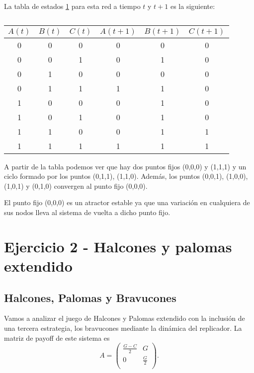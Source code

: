 \documentclass[letterpaper,12pt]{article}
\theoremstyle{plain}
\begin{document}
La tabla de estados \ref*{tab:4} para esta red a tiempo $t$ y $t+1$ es la siguiente:
\newpage
\begin{table}[h]
    \centering
    \begin{tabular}{|c|c|c|c|c|c|}
        \hline
        $A(t)$ & $B(t)$ & $C(t)$ & $A(t+1)$ & $B(t+1)$ & $C(t+1)$ \\
        \hline
        0 & 0 & 0 & 0 & 0 & 0  \\
        0 & 0 & 1 & 0 & 1 & 0  \\
        0 & 1 & 0 & 0 & 0 & 0 \\
        0 & 1 & 1 & 1 & 1 & 0  \\
        1 & 0 & 0 & 0 & 1 & 0  \\
        1 & 0 & 1 & 0 & 1 & 0  \\
        1 & 1 & 0 & 0 & 1 & 1  \\
        1 & 1 & 1 & 1 & 1 & 1  \\
        \hline
    \end{tabular}
    \caption{}
    \label{tab:4}
\end{table}

A partir de la tabla podemos ver que hay dos puntos fijos (0,0,0) y (1,1,1) y un ciclo formado por los puntos (0,1,1), (1,1,0). Además, los puntos (0,0,1), (1,0,0), (1,0,1) y (0,1,0) convergen al punto fijo (0,0,0). 

El punto fijo (0,0,0) es un atractor estable ya que una variación en cualquiera de sus nodos lleva al sistema de vuelta a dicho punto fijo.

\section*{Ejercicio 2 - Halcones y palomas extendido}

\subsection*{Halcones, Palomas y Bravucones}

Vamos a analizar el juego de Halcones y Palomas extendido con la inclusión de una tercera estrategia, los bravucones mediante la dinámica del replicador. La matriz de payoff de este sistema es
\begin{equation*}
    A =
\begin{pmatrix}
\frac{G-C}{2} & G \\[4pt]
0 & \frac{G}{2} \\[4pt]
\end{pmatrix}.
\end{equation*}
\end{document}
